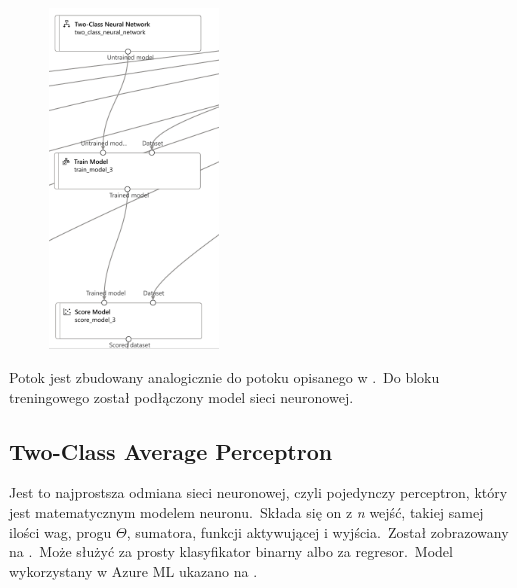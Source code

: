 \begin{figure}[H]
    \centering
    \includegraphics[width=0.4\textwidth]{images/nn_pipe}
    \label{fig:nn-pipe}
\end{figure}

Potok jest zbudowany analogicznie do potoku opisanego w .\ Do bloku treningowego został podłączony model sieci neuronowej.

\subsection{Two-Class Average Perceptron}
Jest to najprostsza odmiana sieci neuronowej, czyli pojedynczy perceptron, który jest matematycznym modelem neuronu.\ Składa się on z \textit{n} wejść, takiej samej ilości wag, progu $\Theta$, sumatora, funkcji aktywującej i wyjścia.\ Został zobrazowany na .\ Może służyć za prosty klasyfikator binarny albo za regresor.\ Model wykorzystany w Azure ML ukazano na .

